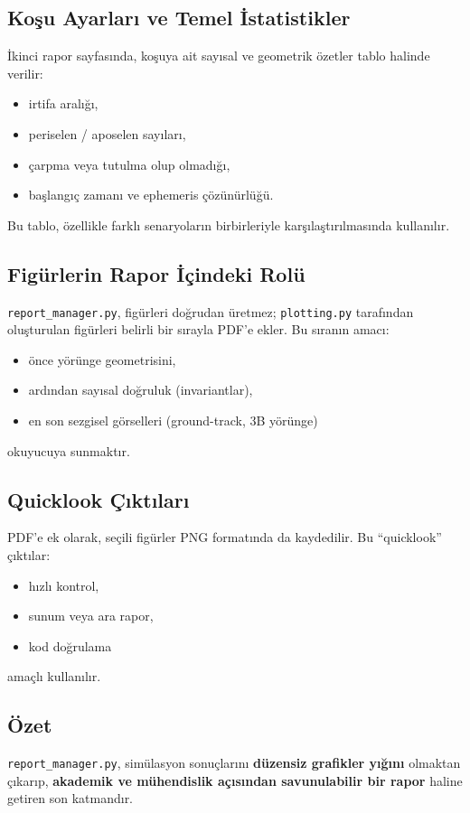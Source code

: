 \subsection*{Koşu Ayarları ve Temel İstatistikler}
İkinci rapor sayfasında,
koşuya ait sayısal ve geometrik özetler tablo halinde verilir:
\begin{itemize}
  \item irtifa aralığı,
  \item periselen / aposelen sayıları,
  \item çarpma veya tutulma olup olmadığı,
  \item başlangıç zamanı ve ephemeris çözünürlüğü.
\end{itemize}

Bu tablo, özellikle farklı senaryoların
birbirleriyle karşılaştırılmasında kullanılır.

\subsection*{Figürlerin Rapor İçindeki Rolü}
\texttt{report\_manager.py},
figürleri doğrudan üretmez;
\texttt{plotting.py} tarafından oluşturulan figürleri
belirli bir sırayla PDF’e ekler.
Bu sıranın amacı:
\begin{itemize}
  \item önce yörünge geometrisini,
  \item ardından sayısal doğruluk (invariantlar),
  \item en son sezgisel görselleri (ground-track, 3B yörünge)
\end{itemize}
okuyucuya sunmaktır.

\subsection*{Quicklook Çıktıları}
PDF’e ek olarak,
seçili figürler PNG formatında da kaydedilir.
Bu “quicklook” çıktılar:
\begin{itemize}
  \item hızlı kontrol,
  \item sunum veya ara rapor,
  \item kod doğrulama
\end{itemize}
amaçlı kullanılır.

\subsection*{Özet}
\texttt{report\_manager.py}, simülasyon sonuçlarını
\textbf{düzensiz grafikler yığını} olmaktan çıkarıp,
\textbf{akademik ve mühendislik açısından savunulabilir bir rapor}
haline getiren son katmandır.

